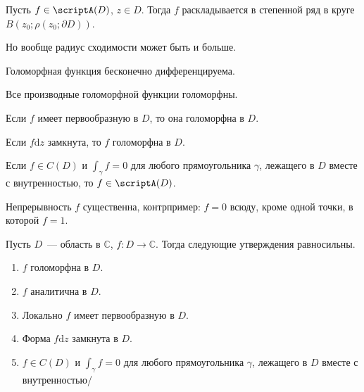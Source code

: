 \documentclass{article}
\begin{document}
    \begin{corollary}
        Пусть $f\in\scriptA(D)$, $z\in D$. Тогда $f$ раскладывается в степенной ряд в круге $B(z_0;\rho(z_0;\partial D))$.
    \end{corollary}
    \begin{remark}
        Но вообще радиус сходимости может быть и больше.
    \end{remark}
    \begin{corollary}
        Голоморфная функция бесконечно дифференцируема.
    \end{corollary}
    \begin{corollary}
        Все производные голоморфной функции голоморфны.
    \end{corollary}
    \begin{corollary}
        Если $f$ имеет первообразную в $D$, то она голоморфна в $D$.
    \end{corollary}
    \begin{corollary}
        \label{cor:Замкнутая форма голоморфна}
        Если $f\mathrm dz$ замкнута, то $f$ голоморфна в $D$.
    \end{corollary}
    \begin{corollary}
        \label{Теорема Морера}
        Если $f\in C(D)$ и $\int_\gamma f=0$ для любого прямоугольника $\gamma$, лежащего в $D$ вместе с внутренностью, то $f\in\scriptA(D)$.
    \end{corollary}
    \begin{remark}
        Непрерывность $f$ существенна, контрпример: $f=0$ всюду, кроме одной точки, в которой $f=1$.
    \end{remark}
    \begin{theorem}
        Пусть $D$~--- область в $\mathbb C$, $f\colon D\to\mathbb C$. Тогда следующие утверждения равносильны.
        \begin{enumerate}
            \item $f$ голоморфна в $D$.
            \item $f$ аналитична в $D$.
            \item Локально $f$ имеет первообразную в $D$.
            \item Форма $f\mathrm dz$ замкнута в $D$.
            \item $f\in C(D)$ и $\int_\gamma f=0$ для любого прямоугольника $\gamma$, лежащего в $D$ вместе с внутренностью/
        \end{enumerate}
    \end{theorem}
\end{document}
